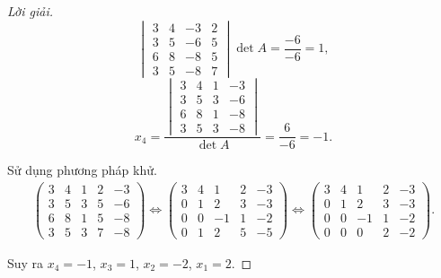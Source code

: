 \documentclass[class=nhvh-linear-algebra,crop=false]{standalone}
\begin{document}
\begin{proof}[Lời giải]
\[{            \begin{vmatrix}
                3 & 4 & -3 & 2 \\
                3 & 5 & -6 & 5 \\
                6 & 8 & -8 & 5 \\
                3 & 5 & -8 & 7
            \end{vmatrix}
        }{\det A} = \dfrac{-6}{-6} = 1,
    \]
    \[
        x_{4} = \dfrac{
            \begin{vmatrix}
                3 & 4 & 1 & -3 \\
                3 & 5 & 3 & -6 \\
                6 & 8 & 1 & -8 \\
                3 & 5 & 3 & -8
            \end{vmatrix}
        }{\det A} = \dfrac{6}{-6} = -1.
    \]
    \bigskip
    \par Sử dụng phương pháp khử.
    \begingroup{}
    \allowdisplaybreaks{}
    \begin{gather*}
        \left(\begin{array}{cccc|c}
                3 & 4 & 1 & 2 & -3 \\
                3 & 5 & 3 & 5 & -6 \\
                6 & 8 & 1 & 5 & -8 \\
                3 & 5 & 3 & 7 & -8
            \end{array}
        \right)
        \Longleftrightarrow{}
        \left(\begin{array}{cccc|c}
                3 & 4 & 1  & 2 & -3 \\
                0 & 1 & 2  & 3 & -3 \\
                0 & 0 & -1 & 1 & -2 \\
                0 & 1 & 2  & 5 & -5
            \end{array}
        \right)
        \Longleftrightarrow{}
        \left(\begin{array}{cccc|c}
                3 & 4 & 1  & 2 & -3 \\
                0 & 1 & 2  & 3 & -3 \\
                0 & 0 & -1 & 1 & -2 \\
                0 & 0 & 0  & 2 & -2
            \end{array}
        \right).
    \end{gather*}
    \endgroup{}
    \par Suy ra $x_{4} = -1$, $x_{3} = 1$, $x_{2} = -2$, $x_{1} = 2$.
\end{proof}
\end{document}
